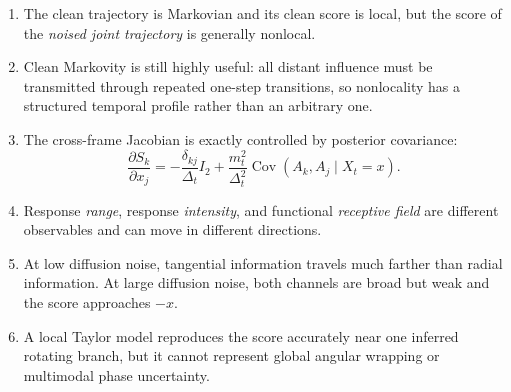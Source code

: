 \documentclass[11pt,a4paper]{article}
\newcommand{\Cov}{\operatorname{Cov}}
\begin{document}
\begin{abstract}
A dynamic object is a whole trajectory, not a set of independent frames. We study the joint diffusion score of a noisy rotating trajectory near a unit ring. The note proceeds in two stages. First, a Cartesian rotating-random-walk surrogate is solved exactly: a known rotation can be removed by an orthogonal change of coordinates, after which the noised score reduces to a Gaussian random-walk term plus a low-dimensional correction generated by the shared ring anchor. Second, the original polar model is treated directly. Its exact radial and angular transition laws are derived from the stochastic differential equations, its noised score is written as a posterior smoothing mean, and its response to perturbing another frame is shown to equal a posterior covariance through a static fluctuation-response identity. A first-order Taylor expansion gives an interpretable linear-Gaussian approximation. Numerical experiments then measure three distinct quantities: the absolute intensity of cross-frame influence, its temporal range, and the finite receptive field needed to approximate the full joint score. The central finding is robust in both models: increasing diffusion time broadens the normalized temporal range of the remaining dependence while strongly reducing its absolute intensity. In the original polar process, tangential information propagates farther than radial information at low noise because radial fluctuations are mean-reverting whereas the angular phase is highly coherent.
\end{abstract}

\begin{keyresult}
\begin{enumerate}
\item The clean trajectory is Markovian and its clean score is local, but the score of the \emph{noised joint trajectory} is generally nonlocal.
\item Clean Markovity is still highly useful: all distant influence must be transmitted through repeated one-step transitions, so nonlocality has a structured temporal profile rather than an arbitrary one.
\item The cross-frame Jacobian is exactly controlled by posterior covariance:
\[
\frac{\partial S_k}{\partial x_j}
=-\frac{\delta_{kj}}{\Delta_t}I_2
+\frac{m_t^2}{\Delta_t^2}\Cov(A_k,A_j\mid X_t=x).
\]
\item Response \emph{range}, response \emph{intensity}, and functional \emph{receptive field} are different observables and can move in different directions.
\item At low diffusion noise, tangential information travels much farther than radial information. At large diffusion noise, both channels are broad but weak and the score approaches $-x$.
\item A local Taylor model reproduces the score accurately near one inferred rotating branch, but it cannot represent global angular wrapping or multimodal phase uncertainty.
\end{enumerate}
\end{keyresult}
\end{document}

